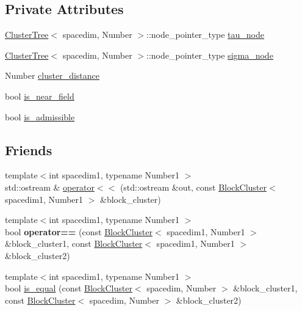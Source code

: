 \subsection*{Private Attributes}
\begin{DoxyCompactItemize}
\item 
\hyperlink{classClusterTree}{Cluster\+Tree}$<$ spacedim, Number $>$\+::node\+\_\+pointer\+\_\+type \hyperlink{classBlockCluster_aac88834478cb4e409596e58100a5e9de}{tau\+\_\+node}
\item 
\hyperlink{classClusterTree}{Cluster\+Tree}$<$ spacedim, Number $>$\+::node\+\_\+pointer\+\_\+type \hyperlink{classBlockCluster_ae1005ec7feedbdb990b27d845b24bad2}{sigma\+\_\+node}
\item 
Number \hyperlink{classBlockCluster_a2b843d0eaae1bf4b49ec82ffcb75e798}{cluster\+\_\+distance}
\item 
bool \hyperlink{classBlockCluster_a6f719cbd6a646328f8128355c857745a}{is\+\_\+near\+\_\+field}
\item 
bool \hyperlink{classBlockCluster_ae85d165894d10b7e58fbe20edd506abe}{is\+\_\+admissible}
\end{DoxyCompactItemize}
\subsection*{Friends}
\begin{DoxyCompactItemize}
\item 
{\footnotesize template$<$int spacedim1, typename Number1 $>$ }\\std\+::ostream \& \hyperlink{classBlockCluster_a9721dfd2e13c7fc896f6f1e9e1c1ed04}{operator$<$$<$} (std\+::ostream \&out, const \hyperlink{classBlockCluster}{Block\+Cluster}$<$ spacedim1, Number1 $>$ \&block\+\_\+cluster)
\item 
\mbox{\label{classBlockCluster_a8695eab8c2364aee31a7f0d93f666b1c}} 
{\footnotesize template$<$int spacedim1, typename Number1 $>$ }\\bool {\bfseries operator==} (const \hyperlink{classBlockCluster}{Block\+Cluster}$<$ spacedim1, Number1 $>$ \&block\+\_\+cluster1, const \hyperlink{classBlockCluster}{Block\+Cluster}$<$ spacedim1, Number1 $>$ \&block\+\_\+cluster2)
\item 
{\footnotesize template$<$int spacedim1, typename Number1 $>$ }\\bool \hyperlink{classBlockCluster_a770daa1c7399aa72cfb7e1e7dc65b6bb}{is\+\_\+equal} (const \hyperlink{classBlockCluster}{Block\+Cluster}$<$ spacedim, Number $>$ \&block\+\_\+cluster1, const \hyperlink{classBlockCluster}{Block\+Cluster}$<$ spacedim, Number $>$ \&block\+\_\+cluster2)
\end{DoxyCompactItemize}


